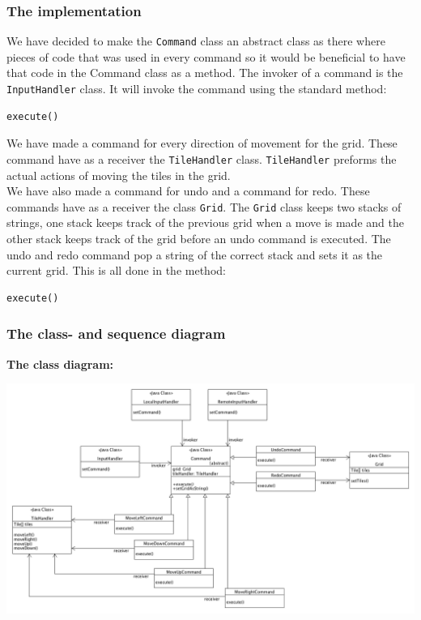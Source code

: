 \documentclass[a4paper,11pt,report]{scrartcl}
\begin{document}
\subsubsection{The implementation}
We have decided to make the \texttt{Command} class an abstract class as there where pieces of code that was used in every command so it would be beneficial to have that code in the Command class as a method.  The invoker of a command is the \texttt{InputHandler} class. It will invoke the command using the standard method: 
\begin{verbatim}
execute()
\end{verbatim}
We have made a command for every direction of movement for the grid. These command have as a receiver the \texttt{TileHandler} class. \texttt{TileHandler} preforms the actual actions of moving the tiles in the grid.\\

We have also made a command for undo and a command for redo. These commands have as a receiver the class \texttt{Grid}. The \texttt{Grid} class keeps two stacks of strings, one stack keeps track of the previous grid when a move is made and the other stack keeps track of the grid before an undo command is executed. The undo and redo command pop a string of the correct stack and sets it as the current grid. This is all done in the method:
\begin{verbatim}
execute()
\end{verbatim}


\newpage
\subsubsection{The class- and sequence diagram}
\textbf{The class diagram:}\\
\centerline{\includegraphics[scale=0.4]{sources/commandPatternUML}}
\end{document}
